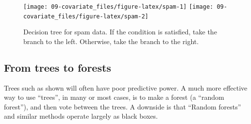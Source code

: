 \documentclass[
  10pt,
  b5paper]{book}
\newenvironment{Shaded}{\begin{snugshade}}{\end{snugshade}}
\newcommand{\AttributeTok}[1]{\textcolor[rgb]{0.77,0.63,0.00}{#1}}
\newcommand{\DecValTok}[1]{\textcolor[rgb]{0.00,0.00,0.81}{#1}}
\newcommand{\FloatTok}[1]{\textcolor[rgb]{0.00,0.00,0.81}{#1}}
\newcommand{\FunctionTok}[1]{\textcolor[rgb]{0.00,0.00,0.00}{#1}}
\newcommand{\NormalTok}[1]{#1}
\newcommand{\SpecialCharTok}[1]{\textcolor[rgb]{0.00,0.00,0.00}{#1}}
\newcommand{\StringTok}[1]{\textcolor[rgb]{0.31,0.60,0.02}{#1}}
\begin{document}
\begin{Shaded}
\end{Shaded}

\begin{figure}[H]
\texttt{[image: 09-covariate\_files/figure-latex/spam-1]} \texttt{[image: 09-covariate\_files/figure-latex/spam-2]} \caption{Decision tree for spam data. If the condition is satisfied, take
               the branch to the left.  Otherwise, take the branch to the right.}\label{fig:spam}
\end{figure}

\hypertarget{from-trees-to-forests}{%
\subsection*{From trees to forests}\label{from-trees-to-forests}}

Trees such as shown will often have poor predictive power.
A much more effective way to use ``trees'', in many or most
cases, is to make a forest (a ``random forest''), and then
vote between the trees. A downside is that ``Random forests''
and similar methods operate largely as black boxes.
\end{document}
